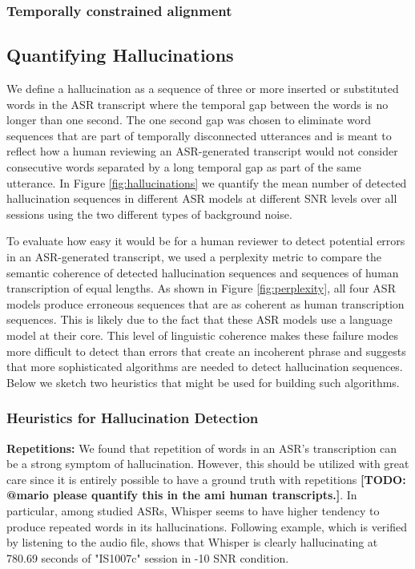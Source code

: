 \documentclass{article}
\begin{document}
\subsubsection{Temporally constrained alignment}

\subsection{Quantifying Hallucinations}
We define a hallucination as a sequence of three or more inserted or substituted words in the ASR transcript where the temporal gap between the words is no longer than one second. The one second gap was chosen to eliminate word sequences that are part of temporally disconnected utterances and is meant to reflect how a human reviewing an ASR-generated transcript would not consider consecutive words separated by a long temporal gap as part of the same utterance. In Figure \ref{fig:hallucinations} we quantify the mean number of detected hallucination sequences in different ASR models at different SNR levels over all sessions using the two different types of background noise.

To evaluate how easy it would be for a human reviewer to detect potential errors in an ASR-generated transcript, we used a perplexity metric \cite{perplexityjelinek1977,perplexityhuggingface} to compare the semantic coherence of detected hallucination sequences and sequences of human transcription of equal lengths. As shown in Figure \ref{fig:perplexity}, all four ASR models produce erroneous sequences that are as coherent as human transcription sequences. This is likely due to the fact that these ASR models use a language model at their core. This level of linguistic coherence makes these failure modes more difficult to detect than errors that create an incoherent phrase and suggests that more sophisticated algorithms are needed to detect hallucination sequences. Below we sketch two heuristics that might be used for building such algorithms.

\subsubsection{Heuristics for Hallucination Detection}
\textbf{Repetitions:} We found that repetition of words in an ASR's transcription can be a strong symptom of hallucination. However, this should be utilized with great care since it is entirely possible to have a ground truth with repetitions \textbf{[TODO: @mario please quantify this in the ami human transcripts.]}. In particular, among studied ASRs, Whisper seems to have higher tendency to produce repeated words in its hallucinations. Following example, which is verified by listening to the audio file, shows that Whisper is clearly hallucinating at 780.69 seconds of "IS1007c" session in -10 SNR condition.
\end{document}
